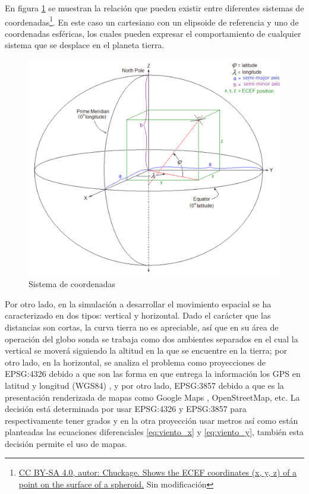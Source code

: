 En figura \ref{fig:crs} se muestran la relación que pueden existir entre diferentes sistemas de coordenadas\footnote{ \href{https://commons.wikimedia.org/wiki/File:International_Standard_Atmosphere.svg}{ CC BY-SA 4.0, autor: Chuckage.  Shows the ECEF coordinates (x, y, z) of a point on the surface of a spheroid.} Sin modificación }. En este caso un cartesiano con un elipsoide de referencia y uno de coordenadas esféricas, los cuales pueden expresar el comportamiento de cualquier sistema que se desplace en el planeta tierra.

\begin{figure}[h]
    \centering
    \includegraphics[scale=0.25]{document/figures/02_ECEF_coordinates.png}
    \caption{Sistema de coordenadas}
    \label{fig:crs}
\end{figure}
Por otro lado, en la simulación a desarrollar el movimiento espacial se ha caracterizado en  dos tipos:  vertical y horizontal. Dado el carácter que las distancias son cortas, la curva tierra no es apreciable, así que en su área de operación del globo sonda se trabaja como dos ambientes separados en el cual la vertical se moverá siguiendo la altitud en la que se encuentre en la tierra; por otro lado, en la horizontal, se analiza el problema como proyecciones de EPSG:4326 debido a que son las forma en que entrega la información los GPS en latitud y longitud (WGS84) \cite{libro_gnss},  y por otro lado, EPSG:3857 debido a que es la presentación renderizada de mapas como Google Maps \cite{google_maps}, OpenStreetMap, etc. La decisión está determinada por usar EPSG:4326 y EPSG:3857 para respectivamente tener grados y en la otra proyección usar metros así como están planteadas las ecuaciones diferenciales \ref{eq:viento_x} y \ref{eq:viento_y}, también esta decisión permite el uso de mapas.
 
